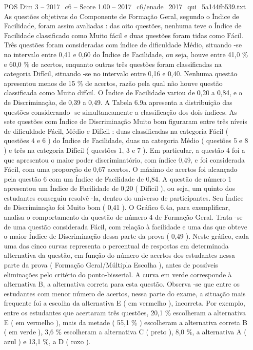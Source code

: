 \begin{textsample}{POS Dim 3 – 2017\_c6 – Score 1.00 – 2017\_c6/enade\_2017\_qui\_5a144fb539.txt}
As questões objetivas do Componente de Formação Geral, segundo o Índice de Facilidade, foram assim avaliadas : das oito questões, nenhuma teve o Índice de Facilidade classificado como Muito fácil e duas questões foram tidas como Fácil.
Três questões foram consideradas com índice de dificuldade Médio, situando -se no intervalo entre 0,41 e 0,60 do Índice de Facilidade, ou seja, houve entre 41,0 \% e 60,0 \% de acertos, enquanto outras três questões foram classificadas na categoria Difícil, situando -se no intervalo entre 0,16 e 0,40.
Nenhuma questão apresentou menos de 15 \% de acertos, razão pela qual não houve questão classificada como Muito difícil.
O Índice de Facilidade variou de 0,20 a 0,84, e o de Discriminação, de 0,39 a 0,49.
A Tabela 6.9a apresenta a distribuição das questões considerando -se simultaneamente a classificação dos dois índices.
As sete questões com Índice de Discriminação Muito bom figuraram entre três níveis de dificuldade Fácil, Médio e Difícil : duas classificadas na categoria Fácil ( questões 4 e 6 ) do Índice de Facilidade, duas na categoria Médio ( questões 5 e 8 ) e três na categoria Difícil ( questões 1, 3 e 7 ).
Em particular, a questão 4 foi a que apresentou o maior poder discriminatório, com índice 0,49, e foi considerada Fácil, com uma proporção de 0,67 acertos.
O máximo de acertos foi alcançado pela questão 6 com um Índice de Facilidade de 0,84.
A questão de número 1 apresentou um Índice de Facilidade de 0,20 ( Difícil ), ou seja, um quinto dos estudantes conseguiu resolvê -la, dentro do universo de participantes.
Seu Índice de Discriminação foi Muito bom ( 0,41 ).
O Gráfico 6.4a, para exemplificar, analisa o comportamento da questão de número 4 de Formação Geral.
Trata -se de uma questão considerada Fácil, com relação à facilidade e uma das que obteve o maior Índice de Discriminação dessa parte da prova ( 0,49 ).
Neste gráfico, cada uma das cinco curvas representa o percentual de respostas em determinada alternativa da questão, em função do número de acertos dos estudantes nessa parte da prova ( Formação Geral/Múltipla Escolha ), antes de possíveis eliminações pelo critério do ponto-bisserial.
A curva em verde corresponde à alternativa B, a alternativa correta para esta questão.
Observa -se que entre os estudantes com menor número de acertos, nessa parte do exame, a situação mais frequente foi a escolha da alternativa E ( em vermelho ), incorreta.
Por exemplo, entre os estudantes que acertaram três questões, 20,1 \% escolheram a alternativa E ( em vermelho ), mais da metade ( 55,1 \% ) escolheram a alternativa correta B ( em verde ), 3,6 \% escolheram a alternativa C ( preto ), 8,0 \%, a alternativa A ( azul ) e 13,1 \%, a D ( roxo ).

\end{textsample}
